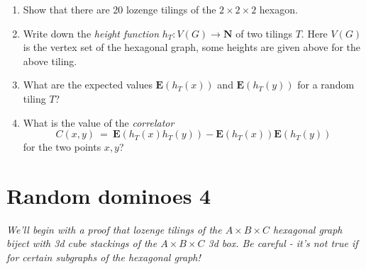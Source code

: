 \documentclass[11pt,fleqn]{book} %
\begin{document}
\begin{problem}
\begin{center}
 \end{center} 
 \begin{enumerate}[label =\alph*.]
  \item Show that there are 20 lozenge tilings of the $2\times 2 \times 2$ hexagon. 
  \item Write down the \textit{height function} $h_T:V(G)\to \mathbf{N}$ of two tilings $T$. Here $V(G)$ is the vertex set of  the hexagonal graph, some heights are given above for the above tiling.
  \item What are the expected values $\textbf{E}(h_T(x))$ and $\textbf{E}(h_T(y))$ for a random tiling $T$?
  \item What is the value of the \textit{correlator} 
   $$C(x,y) \ = \ \textbf{E}(h_T(x)h_T(y)) - \textbf{E}(h_T(x))\textbf{E}(h_T(y))$$
   for the two points $x,y$?
 \end{enumerate}
\end{problem}














\newpage 
 \chapter{Random dominoes 4}


\setcounter{problem}{0}

\textit{We'll begin with a proof that lozenge tilings of the $A\times B \times C$ hexagonal graph biject with 3d cube stackings of the $A\times B\times C$ 3d box. Be careful - it's not true if for certain subgraphs of the hexagonal graph!}
\end{document}
